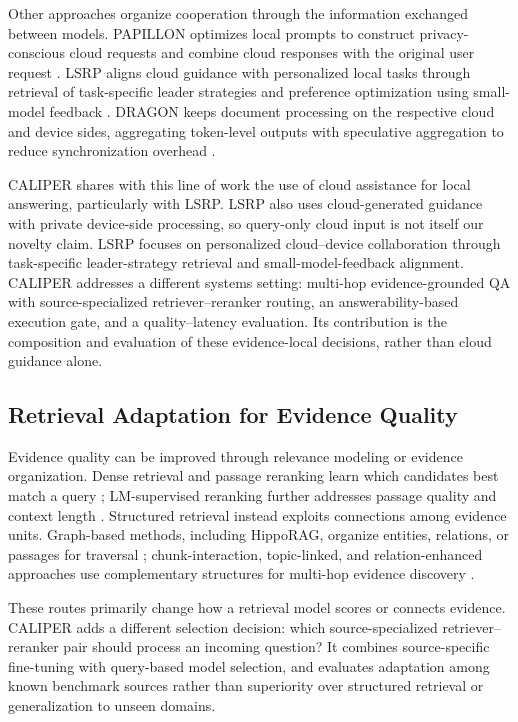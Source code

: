\documentclass[a4paper,fleqn]{cas-dc}
\begin{document}
Other approaches organize cooperation through the information exchanged between models. PAPILLON optimizes local prompts to construct privacy-conscious cloud requests and combine cloud responses with the original user request \cite{siyan2025papillon}. LSRP aligns cloud guidance with personalized local tasks through retrieval of task-specific leader strategies and preference optimization using small-model feedback \cite{zhang2025lsrp}. DRAGON keeps document processing on the respective cloud and device sides, aggregating token-level outputs with speculative aggregation to reduce synchronization overhead \cite{liu2025dragon}.

CALIPER shares with this line of work the use of cloud assistance for local answering, particularly with LSRP. LSRP also uses cloud-generated guidance with private device-side processing, so query-only cloud input is not itself our novelty claim. LSRP focuses on personalized cloud--device collaboration through task-specific leader-strategy retrieval and small-model-feedback alignment. CALIPER addresses a different systems setting: multi-hop evidence-grounded QA with source-specialized retriever--reranker routing, an answerability-based execution gate, and a quality--latency evaluation. Its contribution is the composition and evaluation of these evidence-local decisions, rather than cloud guidance alone.

\subsection{Retrieval Adaptation for Evidence Quality}
Evidence quality can be improved through relevance modeling or evidence organization. Dense retrieval and passage reranking learn which candidates best match a query \cite{xiao2024c,nogueira2019passage}; LM-supervised reranking further addresses passage quality and context length \cite{zhai2025rag}. Structured retrieval instead exploits connections among evidence units. Graph-based methods, including HippoRAG, organize entities, relations, or passages for traversal \cite{he2024g,gutierrez2024hipporag,fang2024trace}; chunk-interaction, topic-linked, and relation-enhanced approaches use complementary structures for multi-hop evidence discovery \cite{guo2025leveraging,chen2026tgrag,li2025recot}.

These routes primarily change how a retrieval model scores or connects evidence. CALIPER adds a different selection decision: which source-specialized retriever--reranker pair should process an incoming question? It combines source-specific fine-tuning with query-based model selection, and evaluates adaptation among known benchmark sources rather than superiority over structured retrieval or generalization to unseen domains.
\end{document}
